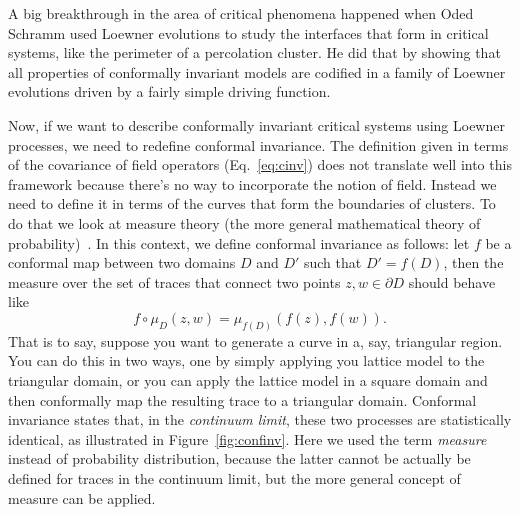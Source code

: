 A big breakthrough in the area of critical phenomena happened when Oded Schramm
used Loewner evolutions to study the interfaces that form in critical systems,
like the perimeter of a percolation cluster. He did that by showing that all
properties of conformally invariant models are codified in a family of Loewner
evolutions driven by a fairly simple driving function.

Now, if we want to describe conformally invariant critical systems using Loewner
processes, we need to redefine conformal invariance. The definition given in
terms of the covariance of field operators (Eq.~\ref{eq:cinv}) does not
translate well into this framework because there's no way to incorporate the
notion of field. Instead we need to define it in terms of the curves that form
the boundaries of clusters. To do that we look at measure theory (the more
general mathematical theory of probability)~\cite{Ash2000}. In this context, we
define conformal invariance as follows: let $f$ be a conformal map between two
domains $D$ and $D'$ such that $D'=f(D)$, then the measure over the set of traces
that connect two points $z,w\in\partial D$ should behave like
\begin{equation}
    \newcommand{\pp}[1]{\left(#1\right)}
    f\circ\mu_D\pp{z,w} = \mu_{f(D)}\pp{f\pp{z}, f\pp{w}}.
\end{equation}
That is to say, suppose you want to generate a curve in a, say, triangular
region. You can do this in two ways, one by simply applying you lattice model
to the triangular domain, or you can apply the lattice model in a square domain
and then conformally map the resulting trace to a triangular domain. Conformal
invariance states that, in the \textit{continuum limit}, these two processes
are statistically identical, as illustrated in Figure~\ref{fig:confinv}. Here
we used the term \textit{measure} instead of probability distribution, because
the latter cannot be actually be defined for traces in the continuum limit, but
the more general concept of measure can be applied.

